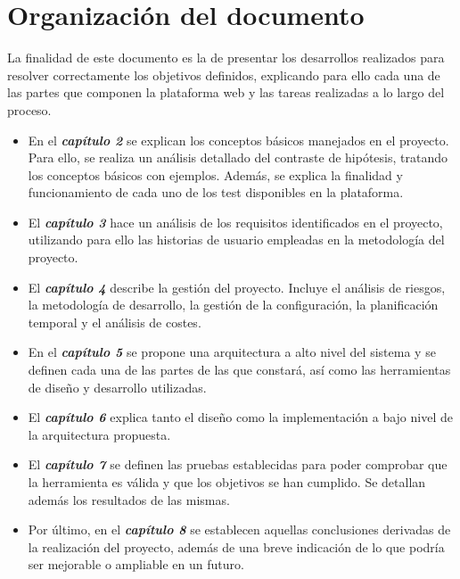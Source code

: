 
\section{Organización del documento}
La finalidad de este documento es la de presentar los desarrollos realizados para resolver correctamente los objetivos definidos, explicando para ello cada una de las partes que componen la plataforma web y las tareas realizadas a lo largo del proceso.
\begin{itemize}
\item En el \textit{\textbf{capítulo 2}} se explican los conceptos básicos manejados en el proyecto. Para ello, se realiza un análisis detallado del contraste de hipótesis, tratando los conceptos básicos con ejemplos. Además, se explica la finalidad y funcionamiento de cada uno de los test disponibles en la plataforma.
\item El \textit{\textbf{capítulo 3}} hace un análisis de los requisitos identificados en el proyecto, utilizando para ello las historias de usuario empleadas en la metodología del proyecto.
\item El \textit{\textbf{capítulo 4}} describe la gestión del proyecto. Incluye el análisis de riesgos, la metodología de desarrollo, la gestión de la configuración, la planificación temporal y el análisis de costes.
\item En el \textit{\textbf{capítulo 5}} se propone una arquitectura a alto nivel del sistema y se definen cada una
de las partes de las que constará, así como las herramientas de diseño y desarrollo utilizadas.
\item El \textit{\textbf{capítulo 6}} explica tanto el diseño como la implementación a bajo nivel de la arquitectura
propuesta.
\item El \textit{\textbf{capítulo 7}} se definen las pruebas establecidas para poder comprobar que la herramienta es válida y que los objetivos se han cumplido. Se detallan además los resultados de las mismas.
\item Por último, en el \textit{\textbf{capítulo 8}} se establecen aquellas conclusiones derivadas de la realización del
proyecto, además de una breve indicación de lo que podría ser mejorable o ampliable en un futuro.
\end{itemize}


